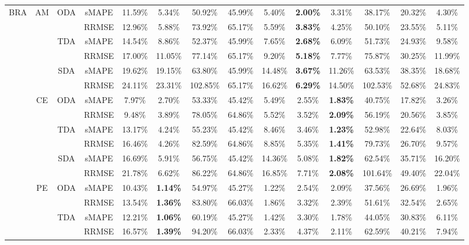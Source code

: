 {\begin{longtable}[htb!]{cccc|ccccc|ccccc}
BRA & {AM} & {ODA} & sMAPE & 11.59\% & 5.34\% & 50.92\% & 45.99\% & 5.40\% & \textbf{2.00\%} & 3.31\% & 38.17\% & 20.32\% & 4.30\% \\
 &  &  & RRMSE & 12.96\% & 5.88\% & 73.92\% & 65.17\% & 5.59\% & \textbf{3.83\%} & 4.25\% & 50.10\% & 23.55\% & 5.11\% \\
 &  & {TDA} & sMAPE & 14.54\% & 8.86\% & 52.37\% & 45.99\% & 7.65\% & \textbf{2.68\%} & 6.09\% & 51.73\% & 24.93\% & 9.58\% \\
 &  &  & RRMSE & 17.00\% & 11.05\% & 77.14\% & 65.17\% & 9.20\% & \textbf{5.18\%} & 7.77\% & 75.87\% & 30.25\% & 11.99\% \\
 &  & {SDA} & sMAPE & 19.62\% & 19.15\% & 63.80\% & 45.99\% & 14.48\% & \textbf{3.67\%} & 11.26\% & 63.53\% & 38.35\% & 18.68\% \\
 &  &  & RRMSE & 24.11\% & 23.31\% & 102.85\% & 65.17\% & 16.62\% & \textbf{6.29\%} & 14.50\% & 102.53\% & 52.68\% & 24.83\% \\ \cline{2-14}
 & {CE} & {ODA} & sMAPE & 7.97\% & 2.70\% & 53.33\% & 45.42\% & 5.49\% & 2.55\% & \textbf{1.83\%} & 40.75\% & 17.82\% & 3.26\% \\
 &  &  & RRMSE & 9.48\% & 3.89\% & 78.05\% & 64.86\% & 5.52\% & 3.52\% & \textbf{2.09\%} & 56.19\% & 20.56\% & 3.85\% \\
 &  & {TDA} & sMAPE & 13.17\% & 4.24\% & 55.23\% & 45.42\% & 8.46\% & 3.46\% & \textbf{1.23\%} & 52.98\% & 22.64\% & 8.03\% \\
 &  &  & RRMSE & 16.46\% & 4.26\% & 82.59\% & 64.86\% & 8.85\% & 5.35\% & \textbf{1.41\%} & 79.73\% & 26.70\% & 9.57\% \\
 &  & {SDA} & sMAPE & 16.69\% & 5.91\% & 56.75\% & 45.42\% & 14.36\% & 5.08\% & \textbf{1.82\%} & 62.54\% & 35.71\% & 16.20\% \\
 &  &  & RRMSE & 21.78\% & 6.62\% & 86.22\% & 64.86\% & 16.85\% & 7.71\% & \textbf{2.08\%} & 101.64\% & 49.40\% & 22.04\% \\ \cline{2-14}
 & {PE} & {ODA} & sMAPE & 10.43\% & \textbf{1.14\%} & 54.97\% & 45.27\% & 1.22\% & 2.54\% & 2.09\% & 37.56\% & 26.69\% & 1.96\% \\
 &  &  & RRMSE & 13.54\% & \textbf{1.36\%} & 83.80\% & 66.03\% & 1.86\% & 3.32\% & 2.39\% & 51.61\% & 32.54\% & 2.65\% \\
 &  & {TDA} & sMAPE & 12.21\% & \textbf{1.06\%} & 60.19\% & 45.27\% & 1.42\% & 3.30\% & 1.78\% & 44.05\% & 30.83\% & 6.11\% \\
 &  &  & RRMSE & 16.57\% & \textbf{1.39\%} & 94.20\% & 66.03\% & 2.33\% & 4.37\% & 2.11\% & 62.59\% & 40.21\% & 7.94\% \\

\end{longtable}}

